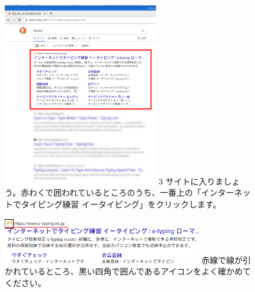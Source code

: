 \documentclass[a4paper,12pt]{jarticle}
\begin{document}
\begin{figure}[t]
  \begin{minipage}{6.582cm}
    \includegraphics[width=6.796cm]{textbook-img086.png}
    3 サイトに入りましょう。赤わくで囲われているところのうち、一番上の「インターネットでタイピング練習 イータイピング」をクリックします。
  \end{minipage}
  \begin{minipage}{8.482cm}
    \includegraphics[width=8.714cm]{textbook-img085.png}
    赤線で線が引かれているところ、黒い四角で囲んであるアイコンをよく確かめてください。
  \end{minipage}






  \centering



\end{figure}
\clearpage
\end{document}
